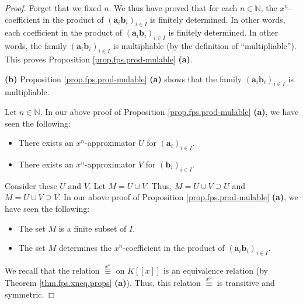 \begin{fineprint}
\begin{proof}
Forget that we fixed $n$. We thus have proved that for each $n\in\mathbb{N}$,
the $x^{n}$-coefficient in the product of $\left(  \mathbf{a}_{i}%
\mathbf{b}_{i}\right)  _{i\in I}$ is finitely determined. In other words, each
coefficient in the product of $\left(  \mathbf{a}_{i}\mathbf{b}_{i}\right)
_{i\in I}$ is finitely determined. In other words, the family $\left(
\mathbf{a}_{i}\mathbf{b}_{i}\right)  _{i\in I}$ is multipliable (by the
definition of \textquotedblleft multipliable\textquotedblright). This proves
Proposition \ref{prop.fps.prod-mulable} \textbf{(a)}. \medskip

\textbf{(b)} Proposition \ref{prop.fps.prod-mulable} \textbf{(a)} shows that
the family $\left(  \mathbf{a}_{i}\mathbf{b}_{i}\right)  _{i\in I}$ is multipliable.

Let $n\in\mathbb{N}$. In our above proof of Proposition
\ref{prop.fps.prod-mulable} \textbf{(a)}, we have seen the following:

\begin{itemize}
\item There exists an $x^{n}$-approximator $U$ for $\left(  \mathbf{a}%
_{i}\right)  _{i\in I}$.

\item There exists an $x^{n}$-approximator $V$ for $\left(  \mathbf{b}%
_{i}\right)  _{i\in I}$.
\end{itemize}

Consider these $U$ and $V$. Let $M=U\cup V$. Thus, $M=U\cup V\supseteq U$ and
$M=U\cup V\supseteq V$. In our above proof of Proposition
\ref{prop.fps.prod-mulable} \textbf{(a)}, we have seen the following:

\begin{itemize}
\item The set $M$ is a finite subset of $I$.

\item The set $M$ determines the $x^{n}$-coefficient in the product of
$\left(  \mathbf{a}_{i}\mathbf{b}_{i}\right)  _{i\in I}$.
\end{itemize}

We recall that the relation $\overset{x^{n}}{\equiv}$ on $K\left[  \left[
x\right]  \right]  $ is an equivalence relation (by Theorem
\ref{thm.fps.xneq.props} \textbf{(a)}). Thus, this relation $\overset{x^{n}%
}{\equiv}$ is transitive and symmetric.


\end{proof}
\end{fineprint}
